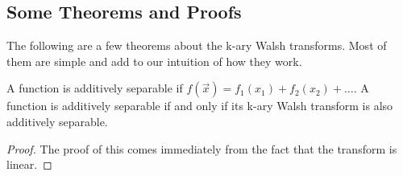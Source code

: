 \subsection{Some Theorems and Proofs}
The following are a few theorems about the k-ary Walsh transforms.
Most of them are simple and add to our intuition of how they work.

\begin{theorem}
A function is additively separable if $f(\vec{x})=f_1(x_1)+f_2(x_2)+\ldots$.
A function is additively separable if and only if its k-ary
Walsh transform is also additively separable.
\end{theorem}

\begin{proof}
The proof of this comes immediately from the fact that the transform is
linear.
\end{proof}

